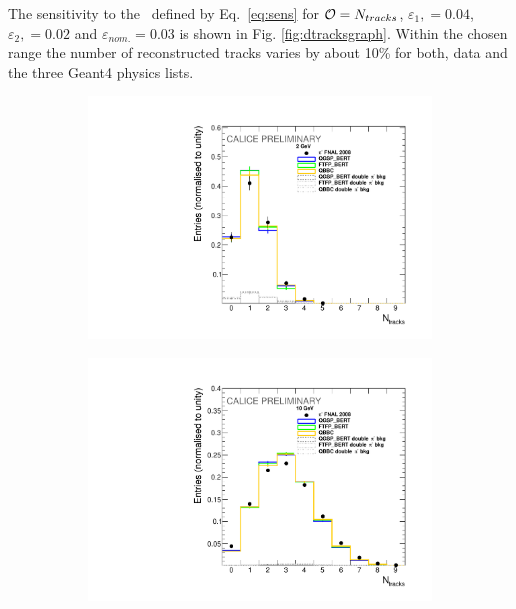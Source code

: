The sensitivity to the \ep\ defined by Eq.~\ref{eq:sens} for ${\cal O}=N_{tracks}$, $\varepsilon_{1},=0.04$, $\varepsilon_{2},=0.02$ and $\varepsilon_{nom.}=0.03$   
is shown in Fig. \ref{fig:dtracksgraph}. Within the chosen range the number of reconstructed tracks varies by about 10\% for both, data and the three {\sc Geant4} physics lists. 
\begin{figure}[H]
	\centering
	\begin{subfigure}{0.5\textwidth}
		\centering
		\includegraphics[width=.90\linewidth]{ECAL/plots/ntracks-2.pdf}
		\caption{\label{fig:tr2} }
	\end{subfigure}%
	\begin{subfigure}{0.5\textwidth}
		\centering
		\includegraphics[width=.90\linewidth]{ECAL/plots/ntracks-10.pdf}

\end{subfigure}
\end{figure}
